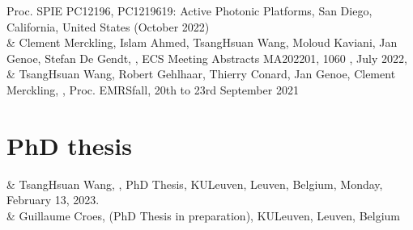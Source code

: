 \documentclass[a4paper,10pt,english,openany,oneside]{jupyterBook}
\begin{document}
\begin{savenotes}
\begin{tabular}[t]{}
Proc. SPIE PC12196, PC1219619: Active Photonic Platforms, San Diego, California, United States (October 2022)
\\
\sphinxhline&
\sphinxAtStartPar
Clement Merckling,
Islam Ahmed,
Tsang\sphinxhyphen{}Hsuan Wang,
Moloud Kaviani,
Jan Genoe,
Stefan De Gendt,
,
ECS Meeting Abstracts MA2022\sphinxhyphen{}01, 1060 , July 2022,
\\
\sphinxhline&
\sphinxAtStartPar
Tsang\sphinxhyphen{}Hsuan Wang,
Robert Gehlhaar,
Thierry Conard,
Jan Genoe,
Clement Merckling,
,
Proc. E\sphinxhyphen{}MRS\sphinxhyphen{}fall, 20th to 23rd September 2021
\\
\sphinxbottomrule
\end{tabular}
\sphinxtableafterendhook\par
\sphinxattableend\end{savenotes}


\section{PhD thesis}
\label{\detokenize{Publications:phd-thesis}}

\begin{savenotes}\sphinxattablestart
\sphinxthistablewithglobalstyle
\centering
{}
\sphinxthecaptionisattop
{}\label{\detokenize{Publications:phd}}
\sphinxaftertopcaption
\begin{tabular}[t]{}
\sphinxtoprule
\sphinxtableatstartofbodyhook
\sphinxAtStartPar
{}
&
\sphinxAtStartPar
Tsang\sphinxhyphen{}Hsuan Wang,
,
PhD Thesis, KULeuven, Leuven, Belgium, Monday, February 13, 2023.
\\
\sphinxhline
\sphinxAtStartPar
{}
&
\sphinxAtStartPar
Guillaume Croes, (PhD Thesis in preparation), KULeuven, Leuven, Belgium
\\
\sphinxbottomrule
\end{tabular}
\sphinxtableafterendhook\par
\sphinxattableend\end{savenotes}
\end{document}
